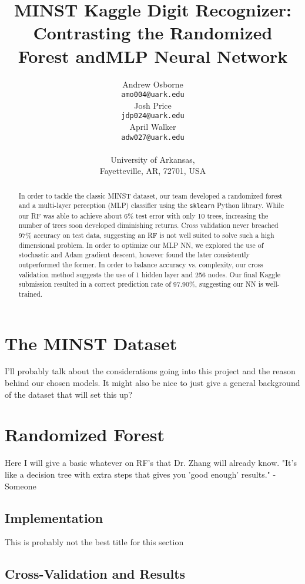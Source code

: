 \documentclass{article}
\title{MINST Kaggle Digit Recognizer: Contrasting the Randomized Forest andMLP Neural Network}
\author{%
   Andrew Osborne \\
   \texttt{amo004@uark.edu} \\
   \And
   Josh Price \\
   \texttt{jdp024@uark.edu} \\
   \AND
   April Walker \\
   \texttt{adw027@uark.edu} \\
   \\
   University of Arkansas, \\
   Fayetteville, AR, 72701, USA
}
\begin{document}

\maketitle

\begin{abstract}
  In order to tackle the classic MINST dataset, our team developed a randomized forest and a multi-layer perception (MLP) classifier using the \verb+sklearn+ Python library. While our RF was able to achieve about 6\% test error with only 10 trees, increasing the number of trees soon developed diminishing returns. Cross validation never breached 97\% accuracy on test data, suggesting an RF is not well suited to solve such a high dimensional problem. In order to optimize our MLP NN, we explored the use of stochastic and Adam gradient descent, however found the later consistently outperformed the former. In order to balance accuracy vs. complexity, our cross validation method suggests the use of 1 hidden layer and 256 nodes. Our final Kaggle submission resulted in a correct prediction rate of 97.90\%, suggesting our NN is well-trained.    
\end{abstract}

\section{The MINST Dataset}

I'll probably talk about the considerations going into this project and the reason behind our chosen models. It might also be nice to just give a general background of the dataset that will set this up?

\section{Randomized Forest}

Here I will give a basic whatever on RF's that Dr. Zhang will already know. "It's like a decision tree with extra steps that gives you 'good enough' results." -Someone

\subsection{Implementation}

This is probably not the best title for this section

\subsection{Cross-Validation and Results}
\end{document}
